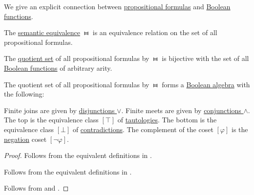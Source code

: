 \begin{theorem}\label{thm:propositional_formula_cosets_are_boolean_functions}
  We give an explicit connection between \hyperref[def:propositional_syntax/formula]{propositional formulas} and \hyperref[def:boolean_function]{Boolean functions}.

  \begin{thmenum}
     The \hyperref[def:propositional_semantics/equivalence]{semantic equivalence} \( \gleichstark \) is an equivalence relation on the set of all propositional formulas.

     The \hyperref[def:equivalence_relation/quotient]{quotient set} of all propositional formulas by \( \gleichstark \) is bijective with the set of all \hyperref[def:boolean_function]{Boolean functions} of arbitrary arity.

     The quotient set of all propositional formulas by \( \gleichstark \) forms a \hyperref[def:boolean_algebra]{Boolean algebra} with the following:
    \begin{reflist}
       Finite joins are given by \hyperref[def:propositional_language/connectives/disjunction]{disjunctions \( \vee \)}.
       Finite meets are given by \hyperref[def:propositional_language/connectives/conjunction]{conjunctions \( \wedge \)}.
       The top is the equivalence class \( [\top] \) of \hyperref[def:propositional_semantics/tautology]{tautologies}.
       The bottom is the equivalence class \( [\bot] \) of \hyperref[def:propositional_semantics/contradiction]{contradictions}.
       The complement of the coset \( [\varphi] \) is the \hyperref[def:propositional_language/negation]{negation} coset \( [\neg \varphi] \).
    \end{reflist}
  \end{thmenum}
\end{theorem}
\begin{proof}
   Follows from the equivalent definitions in .

   Follows from the equivalent definitions in .

   Follows from  and .
\end{proof}


